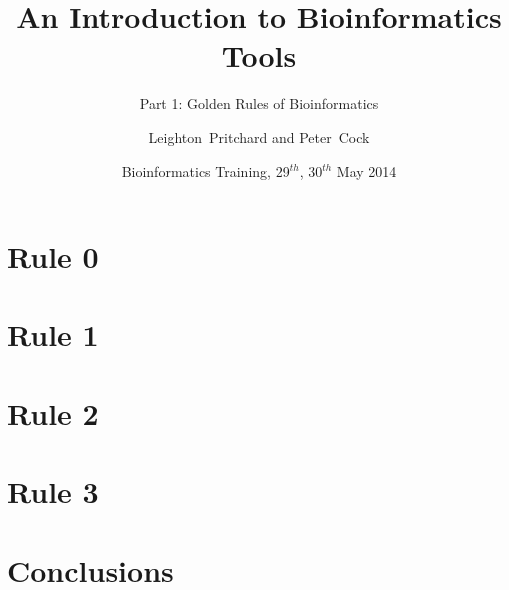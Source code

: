 
%



\title[Intro to Bioinformatics] %
{An Introduction to Bioinformatics Tools}
\subtitle{Part 1: Golden Rules of Bioinformatics}
\author[Pritchard, Cock] %
{Leighton~Pritchard and Peter~Cock}
\date[May 2014] %
{Bioinformatics Training, 29$^{th}$, 30$^{th}$ May 2014}
\subject{Bioinformatics}





\frame[plain]{\titlepage}
  

    
\section{Rule 0}
  

\section{Rule 1}
  
    

\section{Rule 2}
  
    

\section{Rule 3}
  
    

%


\section{Conclusions}
    

